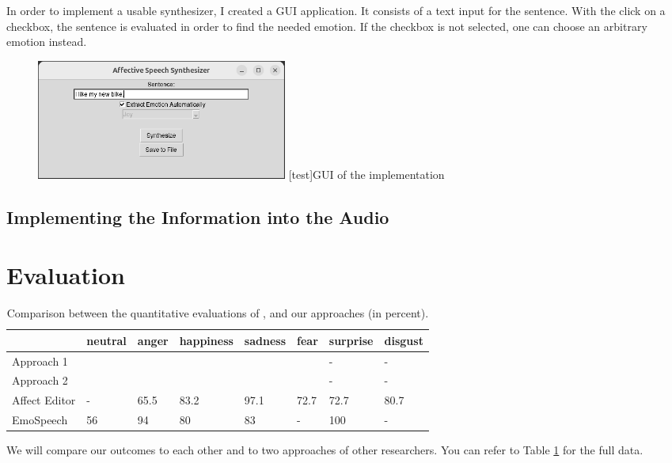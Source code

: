 \documentclass[11pt]{article}
\begin{document}
In order to implement a usable synthesizer, I created a GUI application. It consists of a text input for the sentence. With the click on a checkbox, the sentence is evaluated in order to find the needed emotion. If the checkbox is not selected, one can choose an arbitrary emotion instead.
\begin{figure}[h]
 \centering
\includegraphics[width=0.4\textwidth]{"Bilder/GUI.png"}
[test]{GUI of the implementation}
\end{figure}

\subsection{Implementing the Information into the Audio}

\section{Evaluation}
\begin{table}[t]

\centering
\vspace{5px}
{
\begin{tabular}{|p{2cm}|p{1.5cm}|p{1.5cm}|p{1.5cm}|p{1.5cm}|p{1.5cm}|p{1.5cm}|p{1.5cm}|}
\hline
\rowcolor{mintgreen}&neutral&anger&happiness&sadness&fear&surprise&disgust\\
\hline
\cellcolor{gainsboro}Approach 1&&&&&&-&-\\
\hline
\cellcolor{gainsboro}Approach 2&&&&&&-&-\\
\hline
\hline
\cellcolor{gainsboro}Affect Editor& -&65.5&83.2&97.1&72.7&72.7&80.7\\
\hline
\cellcolor{gainsboro}EmoSpeech&56 &94&80 &83&-&100&-\\
\hline
\end{tabular}
}

\caption{Comparison between the quantitative evaluations of \cite{cahn_generation_nodate}, \cite{diatlova_emospeech_2023} and our approaches (in percent).}
\label{Tabelle}
\end{table}
We will compare our outcomes to each other and to two approaches of other researchers. You can refer to Table \ref{Tabelle} for the full data.
\end{document}

